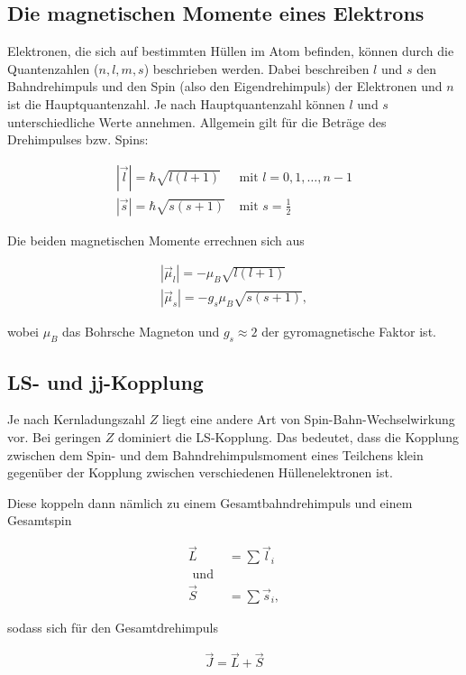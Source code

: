 \subsection{Die magnetischen Momente eines Elektrons}

Elektronen, die sich auf bestimmten Hüllen im Atom befinden, können durch die Quantenzahlen ($n, l, m, s$) beschrieben werden.
Dabei beschreiben $l$ und $s$ den Bahndrehimpuls und den Spin (also den Eigendrehimpuls) der Elektronen und $n$ ist
die Hauptquantenzahl. Je nach Hauptquantenzahl können $l$ und $s$ unterschiedliche Werte annehmen. Allgemein gilt für die
Beträge des Drehimpulses bzw. Spins:

\begin{align}
	|\vec{l}| = \hbar \sqrt{l(l+1)}&\text{ mit } l=0,1,\hdots,n-1\\
	|\vec{s}| = \hbar \sqrt{s(s+1)}&\text{ mit } s=\frac{1}{2}
\end{align}

Die beiden magnetischen Momente errechnen sich aus

\begin{align}
	|\vec{\mu}_l| = -\mu_{B} \sqrt{l(l+1)} \\
	|\vec{\mu}_s| = - g_{s} \mu_{B} \sqrt{s(s+1)} ,
\end{align}

wobei $\mu_B$ das Bohrsche Magneton und $g_s \approx 2$ der gyromagnetische Faktor ist.

\subsection{LS- und jj-Kopplung}

Je nach Kernladungszahl $Z$ liegt eine andere Art von Spin-Bahn-Wechselwirkung vor. Bei geringen $Z$ dominiert die LS-Kopplung.
Das bedeutet, dass die Kopplung zwischen dem Spin- und dem Bahndrehimpulsmoment eines Teilchens klein gegenüber der
Kopplung zwischen verschiedenen Hüllenelektronen ist.

Diese koppeln dann nämlich zu einem Gesamtbahndrehimpuls und einem Gesamtspin

\begin{align}
	\vec{L} &= \sum \vec{l}_i\\
	\text { und }\\
	\vec{S} &= \sum \vec{s}_i,
\end{align}

sodass sich für den Gesamtdrehimpuls

\begin{align}
\vec{J}=\vec{L}+\vec{S}
\end{align}

